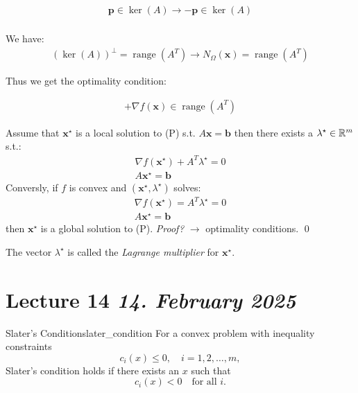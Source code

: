 \begin{remark}{}{}
  \begin{align*}
    \symbf{p} \in \ker(A) \rightarrow -\symbf{p} \in \ker(A) \\
  \end{align*}
\end{remark}

\begin{remark}{}{}
  We have:
  \begin{align*}
    \left(\ker(A)\right)^\perp = \operatorname{range}(A^T) \rightarrow N_{\Omega}(\symbf{x}) = \operatorname{range}(A^T)
  \end{align*}

  Thus we get the optimality condition:

  \begin{align*}
    + \nabla f(\symbf{x}) \in \operatorname{range}(A^T)
  \end{align*}
  
\end{remark}

\begin{lemma}{}{}
  Assume that \(\symbf{x}^\star\) is a local solution to (P) s.t. \(A \symbf{x} = \symbf{b}\) then there exists a \(\lambda^\star \in \mathbb{R}^m\) s.t.:
  \begin{align*}
    \nabla f(\symbf{x}^\star) + A^T \lambda^\star = 0 \\
    A \symbf{x}^\star = \symbf{b}
  \end{align*}
  Conversly, if \(f\) is convex and \((\symbf{x}^\star, \lambda^\star)\) solves:
  \begin{align*}
    \nabla f(\symbf{x}^\star) = A^T \lambda^\star = 0 \\
    A \symbf{x}^\star = \symbf{b}
  \end{align*}
  then \(\symbf{x}^\star\) is a global solution to (P).
  \emph{Proof?} \(\rightarrow\) optimality conditions. \qed
\end{lemma}

The vector \(\lambda^\star\) is called the \emph{Lagrange multiplier} for \(\symbf{x}^\star\).

\section{Lecture 14 \emph{14. February 2025}}

\begin{definition}{Slater's Condition}{slater_condition}
  For a convex problem with inequality constraints
  \[
    c_i(x) \le 0,\quad i=1,2,\dots,m,
  \]
  Slater's condition holds if there exists an \(x\) such that
  \[
    c_i(x) < 0 \quad \text{for all } i.
  \]
\end{definition}


